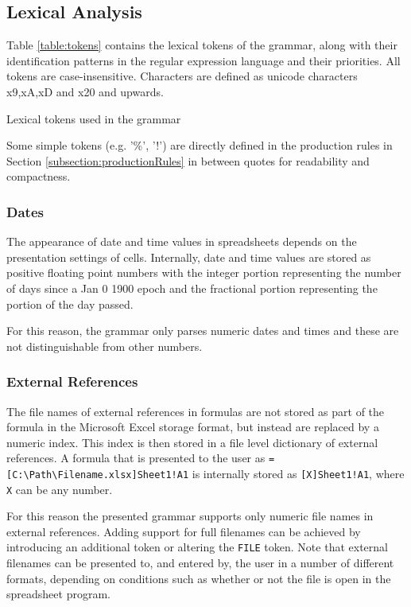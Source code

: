 \documentclass[times]{smrauth}
\begin{document}
\subsection{Lexical Analysis}
Table \ref{table:tokens} contains the lexical tokens of the grammar, along with their identification patterns in the regular expression language and their priorities. All tokens are case-insensitive.
Characters are defined as unicode characters x9,xA,xD and x20 and upwards.

\begin{table}
	\vspace{2mm}
	\caption{Lexical tokens used in the grammar}
	\label{table:tokens}
	\centering
	
\end{table}

Some simple tokens (e.g. '\%', '!') are directly defined in the production rules in Section \ref{subsection:productionRules} in between quotes for readability and compactness.

\subsubsection{\textbf{Dates}}

The appearance of date and time values in spreadsheets depends on the presentation settings of cells. Internally, date and time values are stored as positive floating point numbers with the integer portion representing the number of days since a Jan 0 1900 epoch and the fractional portion representing the portion of the day passed.

For this reason, the grammar only parses numeric dates and times and these are not distinguishable from other numbers.

\subsubsection{\textbf{External References}}
\label{section:externalReferences}
The file names of external references in formulas are not stored as part of the formula in the Microsoft Excel storage format, but instead are replaced by a numeric index.
This index is then stored in a file level dictionary of external references.
A formula that is presented to the user as \texttt{=[C:\textbackslash Path\textbackslash Filename.xlsx]Sheet1!A1} is internally stored as \texttt{[X]Sheet1!A1}, where \texttt{X} can be any number.

For this reason the presented grammar supports only numeric file names in external references.
Adding support for full filenames can be achieved by introducing an additional token or altering the \texttt{FILE} token. Note that external filenames can be presented to, and entered by, the user in a number of different formats, depending on conditions such as whether or not the file is open in the spreadsheet program.
\end{document}
